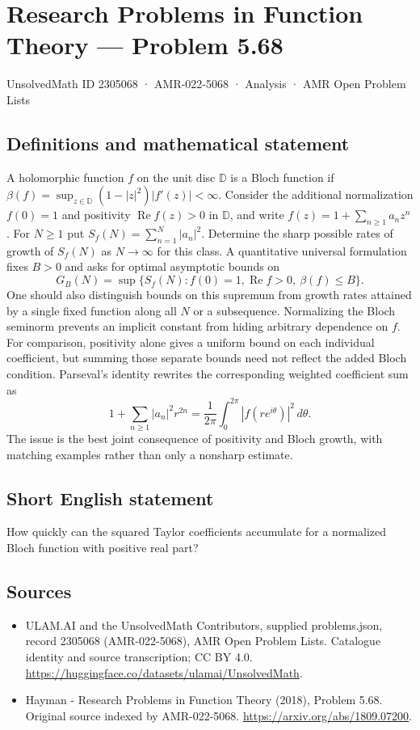 \documentclass[11pt,a4paper]{article}
\begin{document}
\section*{Research Problems in Function Theory — Problem 5.68}\label{2305068}
{\small UnsolvedMath ID 2305068 · AMR-022-5068 · Analysis · AMR Open Problem Lists}
\subsection{Definitions and mathematical statement}
A holomorphic function $f$ on the unit disc $\mathbb D$ is a Bloch function if
$\beta(f)=\sup_{z\in\mathbb D}(1-|z|^2)|f'(z)|<\infty$.
Consider the additional normalization $f(0)=1$ and positivity $\operatorname{Re}f(z)>0$ in $\mathbb D$, and write $f(z)=1+\sum_{n\ge1}a_nz^n$.
For $N\ge1$ put $S_f(N)=\sum_{n=1}^N|a_n|^2$.
Determine the sharp possible rates of growth of $S_f(N)$ as $N\to\infty$ for this class. A quantitative universal formulation fixes $B>0$ and asks for optimal asymptotic bounds on
\[
G_B(N)=\sup\{S_f(N):f(0)=1, \operatorname{Re}f>0,\ \beta(f)\le B\}.
\]
One should also distinguish bounds on this supremum from growth rates attained by a single fixed function along all $N$ or a subsequence. Normalizing the Bloch seminorm prevents an implicit constant from hiding arbitrary dependence on $f$.
For comparison, positivity alone gives a uniform bound on each individual coefficient, but summing those separate bounds need not reflect the added Bloch condition. Parseval's identity rewrites the corresponding weighted coefficient sum as
\[
1+\sum_{n\ge1}|a_n|^2r^{2n}
=\frac1{2\pi}\int_0^{2\pi}|f(re^{i\theta})|^2\,d\theta.
\]
The issue is the best joint consequence of positivity and Bloch growth, with matching examples rather than only a nonsharp estimate.
\subsection{Short English statement}
How quickly can the squared Taylor coefficients accumulate for a normalized Bloch function with positive real part?
\subsection{Sources}
\begin{itemize}
\item[S1] ULAM.AI and the UnsolvedMath Contributors, supplied problems.json, record 2305068 (AMR-022-5068), AMR Open Problem Lists. Catalogue identity and source transcription; CC BY 4.0.
\url{https://huggingface.co/datasets/ulamai/UnsolvedMath}.
\item[S2] Hayman - Research Problems in Function Theory (2018), Problem 5.68. Original source indexed by AMR-022-5068.
\url{https://arxiv.org/abs/1809.07200}.
\end{itemize}
\end{document}
